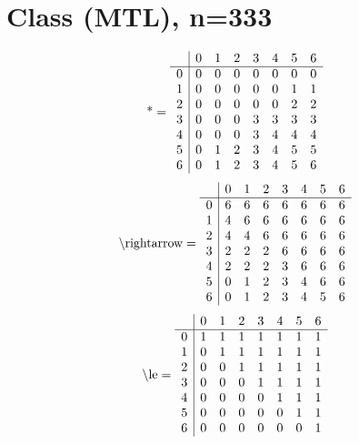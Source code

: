 \documentclass[11pt]{article}
\begin{document}
\section{Class (MTL), n=333}
\[\text{*} = 
\begin{array}{r | r r r r r r r}
 & 0 & 1 & 2 & 3 & 4 & 5 & 6 \\ \hline
0 & 0 & 0 & 0 & 0 & 0 & 0 & 0 \\
1 & 0 & 0 & 0 & 0 & 0 & 1 & 1 \\
2 & 0 & 0 & 0 & 0 & 0 & 2 & 2 \\
3 & 0 & 0 & 0 & 3 & 3 & 3 & 3 \\
4 & 0 & 0 & 0 & 3 & 4 & 4 & 4 \\
5 & 0 & 1 & 2 & 3 & 4 & 5 & 5 \\
6 & 0 & 1 & 2 & 3 & 4 & 5 & 6 \\
\end{array}
\]
\[\text{\textbackslash rightarrow} = 
\begin{array}{r | r r r r r r r}
 & 0 & 1 & 2 & 3 & 4 & 5 & 6 \\ \hline
0 & 6 & 6 & 6 & 6 & 6 & 6 & 6 \\
1 & 4 & 6 & 6 & 6 & 6 & 6 & 6 \\
2 & 4 & 4 & 6 & 6 & 6 & 6 & 6 \\
3 & 2 & 2 & 2 & 6 & 6 & 6 & 6 \\
4 & 2 & 2 & 2 & 3 & 6 & 6 & 6 \\
5 & 0 & 1 & 2 & 3 & 4 & 6 & 6 \\
6 & 0 & 1 & 2 & 3 & 4 & 5 & 6 \\
\end{array}
\]
\[\text{\textbackslash le} = 
\begin{array}{r | r r r r r r r}
 & 0 & 1 & 2 & 3 & 4 & 5 & 6 \\ \hline
0 & 1 & 1 & 1 & 1 & 1 & 1 & 1 \\
1 & 0 & 1 & 1 & 1 & 1 & 1 & 1 \\
2 & 0 & 0 & 1 & 1 & 1 & 1 & 1 \\
3 & 0 & 0 & 0 & 1 & 1 & 1 & 1 \\
4 & 0 & 0 & 0 & 0 & 1 & 1 & 1 \\
5 & 0 & 0 & 0 & 0 & 0 & 1 & 1 \\
6 & 0 & 0 & 0 & 0 & 0 & 0 & 1 \\
\end{array}
\]
\end{document}
